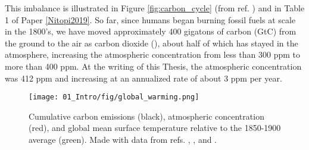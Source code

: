 This imbalance is illustrated in Figure \ref{fig:carbon_cycle} (from ref. ) and in Table 1 of Paper \ref{Nitopi2019}. So far, since humans began burning fossil fuels at scale in the 1800's, we have moved approximately 400 gigatons of carbon (GtC) from the ground to the air as carbon dioxide (), about half of which has stayed in the atmosphere, increasing the atmospheric  concentration from less than 300 ppm to more than 400 ppm\cite{IPCC2014, LeQuere2018}. At the writing of this Thesis, the atmospheric  concentration was 412 ppm and increasing at an annualized rate of about 3 ppm per year\cite{NOAA2019}. 

\begin{figure}[b!]
	\centering
	\texttt{[image: 01\_Intro/fig/global\_warming.png]}
	\caption{Cumulative carbon emissions (black), atmospheric  concentration (red), and global mean surface temperature relative to the 1850-1900 average (green). Made with data from refs. , , and .}
	\label{fig:temperatures}
\end{figure}

